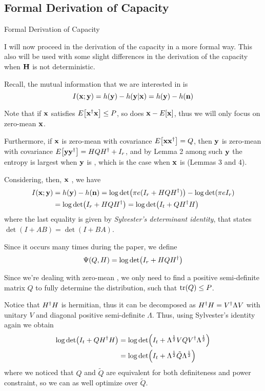 \subsection{Formal Derivation of Capacity}
\begin{frame}[allowframebreaks]{Formal Derivation of Capacity}

I will now proceed in the derivation of the capacity in a more formal way. This also will be used with some slight differences in the derivation of the capacity when $\vb{H}$ is not deterministic.

\medskip
Recall, the mutual information that we are interested in is
$$I(\vb{x};\vb{y}) = h(\vb{y})-h(\vb{y}|\vb{x}) = h(\vb{y})-h(\vb{n})$$

Note that if $\vb{x}$ satisfies $E_{}\qty[\vb{x}^\dagger\vb{x}] \leq P$, so does $\vb{x}-E_{}\qty[\vb{x}]$, thus we will only focus on zero-mean $\vb{x}$.

\medskip
Furthermore, if $\vb{x}$ is zero-mean with covariance $E_{}\qty[\vb{x}\vb{x}^\dagger] = Q$, then $\vb{y}$ is zero-mean with covariance $E_{}\qty[\vb{y}\vb{y}^\dagger] = HQH^\dagger + I_r$, and by Lemma 2 among such $\vb{y}$ the entropy is largest when $\vb{y}$ is \cscg, which is the case when $\vb{x}$ is \cscg{} (Lemmas 3 and 4).

\framebreak

Considering, then, $\vb{x}$ \cscg, we have
\begin{align*}
\begin{split}
I(\vb{x;y}) &= h(\vb{y})-h(\vb{n}) = \log\det(\pi e(I_r + HQH^\dagger)) - \log\det(\pi e I_r)\\
&= \log\det(I_r + HQH^\dagger) = \log\det(I_t + QH^\dagger H)
\end{split}
\end{align*}
where the last equality is given by \textit{Sylvester's determinant identity}, that states $\det(I+AB) = \det(I+BA)$.

\medskip
Since it occurs many times during the paper, we define
$$\Psi(Q,H) = \log\det(I_r + HQH^\dagger)$$

\framebreak

Since we're dealing with zero-mean \cscg, we only need to find a positive semi-definite matrix $Q$ to fully determine the distribution, such that $\tr(Q)\leq P$.

\medskip
Notice that $H^\dagger H$ is hermitian, thus it can be decomposed as $H^\dagger H = V^\dagger\Lambda V$ with unitary $V$ and diagonal positive semi-definite $\Lambda$. Thus, using Sylvester's identity again we obtain
\begin{align*}
\begin{split}
\log\det(I_t + QH^\dagger H) &=
\log\det(I_t + \Lambda^\frac{1}{2}VQV^\dagger\Lambda^\frac{1}{2})\\
&= \log\det(I_t + \Lambda^\frac{1}{2}\tilde{Q}\Lambda^\frac{1}{2})
\end{split}
\end{align*}
where we noticed that $Q$ and $\tilde{Q}$ are equivalent for both definiteness and power constraint, so we can as well optimize over $\tilde{Q}$.


\end{frame}
